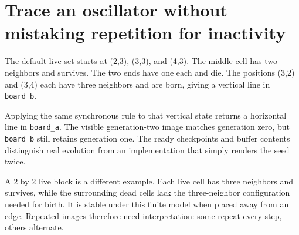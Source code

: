 \section{Trace an oscillator without mistaking repetition for
  inactivity}\label{008-life-generations-p09-trace-an-oscillator-without-mistaking-repetition-for-inactivity}

The default live set starts at (2,3), (3,3), and (4,3). The middle cell
has two neighbors and survives. The two ends have one each and die. The
positions (3,2) and (3,4) each have three neighbors and are born, giving
a vertical line in \texttt{board\_b}.

Applying the same synchronous rule to that vertical state returns a
horizontal line in \texttt{board\_a}. The visible generation-two image
matches generation zero, but \texttt{board\_b} still retains generation
one. The ready checkpoints and buffer contents distinguish real
evolution from an implementation that simply renders the seed twice.

A 2 by 2 live block is a different example. Each live cell has three
neighbors and survives, while the surrounding dead cells lack the
three-neighbor configuration needed for birth. It is stable under this
finite model when placed away from an edge. Repeated images therefore
need interpretation: some repeat every step, others alternate.
